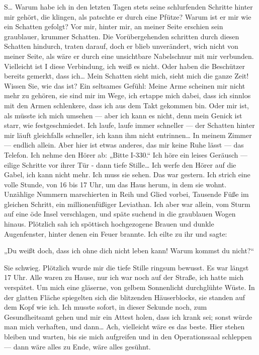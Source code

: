S\ldots{} Warum habe ich in den letzten Tagen stets seine schlurfenden
Schritte hinter mir gehört, die klingen, als patschte er durch eine
Pfütze? Warum ist er mir wie ein Schatten gefolgt? Vor mir, hinter
mir, an meiner Seite erschien sein graublauer, krummer Schatten.
Die Vorübergehenden schritten durch diesen Schatten hindurch,
traten darauf, doch er blieb unverändert, wich nicht von meiner
Seite, als wäre er durch eine unsichtbare Nabelschnur mit mir
verbunden. Vielleicht ist I diese Verbindung, ich weiß es nicht.
Oder haben die Beschützer bereits gemerkt, dass ich\ldots{} Mein
Schatten sieht mich, sieht mich die ganze Zeit! Wissen Sie, wie das
ist? Ein seltsames Gefühl: Meine Arme scheinen mir nicht mehr zu
gehören, sie sind mir im Wege, ich ertappe mich dabei, dass ich
sinnlos mit den Armen schlenkere, dass ich aus dem Takt gekommen
bin. Oder mir ist, als müsste ich mich umsehen — aber ich kann es
nicht, denn mein Genick ist starr, wie festgeschmiedet. Ich laufe,
laufe immer schneller — der Schatten hinter mir läuft gleichfalls
schneller, ich kann ihm nicht entrinnen\ldots{} In meinem Zimmer —
endlich allein. Aber hier ist etwas anderes, das mir keine Ruhe
lässt — das Telefon. Ich nehme den Hörer ab: „Bitte I-330.“ Ich
höre ein leises Geräusch — eilige Schritte vor ihrer Tür - dann
tiefe Stille\ldots{} Ich werfe den Hörer auf
die Gabel, ich kann nicht mehr. Ich muss sie sehen. Das war
gestern. Ich strich eine volle Stunde, von 16 bis 17 Uhr, um das
Haus herum, in dem sie wohnt. Unzählige Nummern marschierten in
Reih und Glied vorbei, Tausende Füße im gleichen Schritt, ein
millionenfüßiger Leviathan. Ich aber war allein, vom Sturm auf eine
öde Insel verschlagen, und späte suchend in die graublauen Wogen
hinaus. Plötzlich sah ich spöttisch hochgezogene Brauen und dunkle
Augenfenster, hinter denen ein Feuer brannte. Ich eilte zu ihr und
sagte:

„Du weißt doch, dass ich ohne dich nicht leben kann! Warum kommst
du nicht?“

Sie schwieg. Plötzlich wurde mir die tiefe Stille ringsum bewusst.
Es war längst 17 Uhr. Alle waren zu Hause, nur ich war noch auf der
Straße, ich hatte mich verspätet. Um mich eine gläserne, von gelbem
Sonnenlicht durchglühte Wüste. In der glatten Fläche spiegelten
sich die blitzenden Häuserblocks, sie standen auf dem Kopf wie ich.
Ich musste sofort, in dieser Sekunde noch, zum Gesundheitsamt gehen
und mir ein Attest holen, dass ich krank sei; sonst würde man mich
verhaften, und dann\ldots{} Ach, vielleicht wäre es das beste. Hier
stehen bleiben und warten, bis sie mich aufgreifen und in den
Operationssaal schleppen — dann wäre alles zu Ende, wäre alles
gesühnt.


